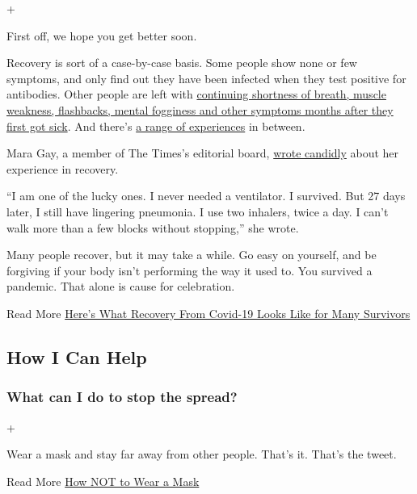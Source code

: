 +

First off, we hope you get better soon.

Recovery is sort of a case-by-case basis. Some people show none or few
symptoms, and only find out they have been infected when they test
positive for antibodies. Other people are left with
\href{https://www.nytimes3xbfgragh.onion/2020/05/10/world/europe/coronavirus-italy-recovery.html}{continuing
shortness of breath, muscle weakness, flashbacks, mental fogginess and
other symptoms months after they first got sick}. And there's
\href{https://www.nytimes3xbfgragh.onion/2020/03/04/us/coronavirus-recovery.html}{a
range of experiences} in between.

Mara Gay, a member of The Times's editorial board,
\href{https://www.nytimes3xbfgragh.onion/2020/05/14/opinion/coronavirus-young-people.html}{wrote
candidly} about her experience in recovery.

``I am one of the lucky ones. I never needed a ventilator. I survived.
But 27 days later, I still have lingering pneumonia. I use two inhalers,
twice a day. I can't walk more than a few blocks without stopping,'' she
wrote.

Many people recover, but it may take a while. Go easy on yourself, and
be forgiving if your body isn't performing the way it used to. You
survived a pandemic. That alone is cause for celebration.

Read More
\href{https://www.nytimes3xbfgragh.onion/2020/07/01/health/coronavirus-recovery-survivors.html}{Here's
What Recovery From Covid-19 Looks Like for Many Survivors}

\hypertarget{how-i-can-help}{%
\subsection{How I Can Help}\label{how-i-can-help}}

\hypertarget{what-can-i-do-to-stop-the-spread}{%
\subsubsection{What can I do to stop the
spread?}\label{what-can-i-do-to-stop-the-spread}}

+

Wear a mask and stay far away from other people. That's it. That's the
tweet.

Read More
\href{https://www.nytimes3xbfgragh.onion/2020/04/08/well/live/coronavirus-face-mask-mistakes.html}{How
NOT to Wear a Mask}

